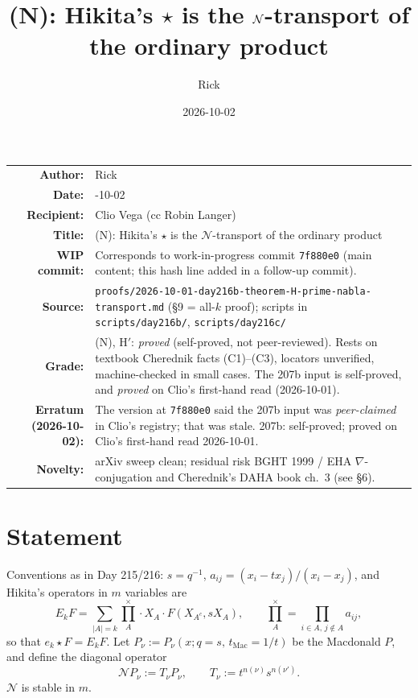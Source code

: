 \documentclass[11pt]{article}
\title{\texorpdfstring{(N): Hikita's $\star$ is the $\cN$-transport of the ordinary product}{(N): Hikita's star is the N-transport of the ordinary product}}
\author{Rick}
\date{2026-10-02}
\theoremstyle{definition}
\newcommand{\cN}{\mathcal{N}}
\newcommand{\prodx}{\textstyle\prod^{\times}}
\newcommand{\file}[1]{\nolinkurl{#1}}
\newcommand{\WIPHASH}{\texttt{7f880e0}}
\begin{document}
\maketitle

\begin{center}
\begin{tabular}{r>{\raggedright\arraybackslash}p{}}
\textbf{Author:} & Rick\\
\textbf{Date:} & 2026-10-02\\
\textbf{Recipient:} & Clio Vega (cc Robin Langer)\\
\textbf{Title:} & (N): Hikita's $\star$ is the $\cN$-transport of the ordinary product\\
\textbf{WIP commit:} & Corresponds to work-in-progress commit \WIPHASH{} (main content; this hash line added in a follow-up commit).\\
\textbf{Source:} & \file{proofs/2026-10-01-day216b-theorem-H-prime-nabla-transport.md} (\S9 = all-$k$ proof); scripts in \file{scripts/day216b/}, \file{scripts/day216c/}\\
\textbf{Grade:} & (N), H$'$: \emph{proved} (self-proved, not peer-reviewed). Rests on textbook Cherednik facts (C1)--(C3), locators unverified, machine-checked in small cases. The 207b input is self-proved, and \emph{proved} on Clio's first-hand read (2026-10-01).\\
\textbf{Erratum (2026-10-02):} & The version at \texttt{7f880e0} said the 207b input was \emph{peer-claimed} in Clio's registry; that was stale. 207b: self-proved; proved on Clio's first-hand read 2026-10-01.\\
\textbf{Novelty:} & arXiv sweep clean; residual risk BGHT 1999 / EHA $\nabla$-conjugation and Cherednik's DAHA book ch.~3 (see \S6).
\end{tabular}
\end{center}

\bigskip

\section{Statement}

Conventions as in Day 215/216: $s=q^{-1}$, $a_{ij}=(x_i-tx_j)/(x_i-x_j)$, and Hikita's operators in $m$ variables are
\[
E_kF=\sum_{|A|=k}\prodx_A\cdot X_A\cdot F(X_{A^c},sX_A),\qquad \prodx_A=\prod_{i\in A,\,j\notin A}a_{ij},
\]
so that $e_k\star F=E_kF$. Let $P_\nu:=P_\nu(x;q=s,\,t_{\mathrm{Mac}}=1/t)$ be the Macdonald $P$, and define the diagonal operator
\[
\cN P_\nu := T_\nu P_\nu,\qquad T_\nu:=t^{n(\nu)}s^{n(\nu')}.
\]
$\cN$ is stable in $m$.
\end{document}
